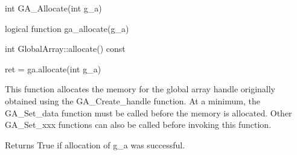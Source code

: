 \documentclass[12pt]{article}
\begin{document}


\begin{capi}
\begin{ccode}
int GA_Allocate(int g_a)
\end{ccode}
\begin{funcargs}
\end{funcargs}
\end{capi}

\begin{fapi}
\begin{fcode}
logical function ga_allocate(g_a)
\end{fcode}
\begin{funcargs}
\end{funcargs}
\end{fapi}

\begin{cxxapi}
\begin{cxxcode}
int GlobalArray::allocate() const
\end{cxxcode}
\end{cxxapi}

\begin{pyapi}
\begin{pycode}
ret = ga.allocate(int g_a)
\end{pycode}
\begin{funcargs}
\end{funcargs}
\end{pyapi}

\gcoll

\begin{desc}

This function allocates the memory for the global array handle originally
obtained using the GA_Create_handle function. At a minimum, the GA_Set_data
function must be called before the memory is allocated. Other GA_Set_xxx
functions can also be called before invoking this function.

Returns True if allocation of g_a was successful.

\end{desc}

\end{document}
